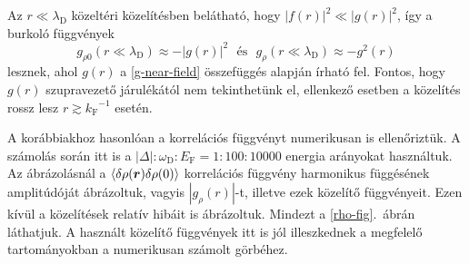 \documentclass[a4paper,12pt,titlepage]{article}
\newcommand{\RR}{{\vb*{r}}}
\newcommand{\kF}{{k_\text{F}}}
\newcommand{\EF}{{E_\text{F}}}
\begin{document}
Az $r \ll \lambda_\text{D}$ közeltéri közelítésben belátható, hogy $\left| f(r) \right|^2 \ll \left| g(r) \right|^2$, így a burkoló függvények
\begin{equation}
	g_{\rho 0}(r \ll \lambda_\text{D}) \approx -\left| g(r) \right|^2 ~~~ \text{és} ~~~ g_\rho(r \ll \lambda_\text{D}) \approx -g^2(r)
\end{equation}
lesznek, ahol $g(r)$ a \eqref{g-near-field} összefüggés alapján írható fel.  Fontos, hogy $g(r)$ szupravezető járulékától nem tekinthetünk el, ellenkező esetben a közelítés rossz lesz $r \gtrsim \kF^{-1}$ esetén.

A korábbiakhoz hasonlóan a korrelációs függvényt numerikusan is ellenőriztük.  A számolás során itt is a $\left| \Delta \right| : \omega_\text{D} : \EF = 1 : 100 : 10000$ energia arányokat használtuk.  Az ábrázolásnál a $\expval{\delta\rho(\RR) \delta\rho(0)}$ korrelációs függvény harmonikus függésének amplitúdóját ábrázoltuk, vagyis $\left| g_\rho(r) \right|$-t, illetve ezek közelítő függvényeit.  Ezen kívül a közelítések relatív hibáit is ábrázoltuk.  Mindezt a \ref{rho-fig}.\ ábrán láthatjuk.  A használt közelítő függvények itt is jól illeszkednek a megfelelő tartományokban a numerikusan számolt görbéhez.
\end{document}
